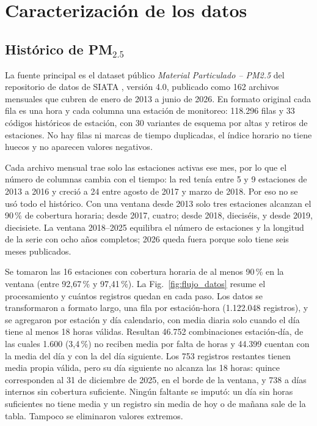 \documentclass[conference]{IEEEtran}
\begin{document}

\section{Caracterización de los datos}
\label{sec:datos}

\subsection{Histórico de PM$_{2.5}$}

La fuente principal es el dataset público \textit{Material Particulado --
PM2.5} del repositorio de datos de SIATA
\cite{siata2026pm25}, versión 4.0, publicado como 162 archivos mensuales
que cubren de enero de 2013 a junio de 2026. En formato original cada fila
es una hora y cada columna una estación de monitoreo: 118.296 filas y 33
códigos históricos de estación, con 30 variantes de esquema por altas y
retiros de estaciones. No hay filas ni marcas de tiempo duplicadas, el índice
horario no tiene huecos y no aparecen valores negativos.

Cada archivo mensual trae solo las estaciones activas ese mes, por lo que
el número de columnas cambia con el tiempo: la red tenía entre 5 y 9
estaciones de 2013 a 2016 y creció a 24 entre agosto de 2017 y marzo de
2018. Por eso no se usó todo el histórico. Con una ventana desde 2013 solo
tres estaciones alcanzan el 90\,\% de cobertura horaria; desde 2017, cuatro;
desde 2018, dieciséis, y desde 2019, diecisiete. La ventana 2018--2025
equilibra el número de estaciones y la longitud de la serie con ocho años
completos; 2026 queda fuera porque solo tiene seis meses publicados.

Se tomaron las 16 estaciones con cobertura horaria de al menos 90\,\% en la
ventana (entre 92,67\,\% y 97,41\,\%). La Fig.~\ref{fig:flujo_datos}
resume el procesamiento y cuántos registros quedan en cada paso. Los datos
se transformaron a formato largo, una fila por estación-hora (1.122.048
registros), y se agregaron por estación y día calendario, con media diaria
solo cuando el día tiene al menos 18 horas válidas. Resultan 46.752
combinaciones estación-día, de las cuales 1.600 (3,4\,\%) no reciben media
por falta de horas y 44.399 cuentan con la media del día y con la del día
siguiente. Los 753 registros restantes tienen media propia válida, pero su
día siguiente no alcanza las 18 horas: quince corresponden al 31 de
diciembre de 2025, en el borde de la ventana, y 738 a días internos sin
cobertura suficiente. Ningún faltante se imputó: un día sin horas
suficientes no tiene media y un registro sin media de hoy o de mañana sale
de la tabla. Tampoco se eliminaron valores extremos.
\end{document}

